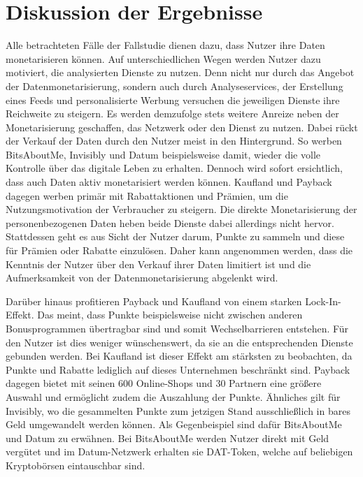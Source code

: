 \section{Diskussion der Ergebnisse}
Alle betrachteten Fälle der Fallstudie dienen dazu, dass Nutzer ihre Daten monetarisieren können. Auf unterschiedlichen Wegen werden Nutzer dazu motiviert, die analysierten Dienste zu nutzen. Denn nicht nur durch das Angebot der Datenmonetarisierung, sondern auch durch Analyseservices, der Erstellung eines Feeds und personalisierte Werbung versuchen die jeweiligen Dienste ihre Reichweite zu steigern. Es werden demzufolge stets weitere Anreize neben der Monetarisierung geschaffen, das Netzwerk oder den Dienst zu nutzen. Dabei rückt der Verkauf der Daten durch den Nutzer meist in den Hintergrund. So werben BitsAboutMe, Invisibly und Datum beispielsweise damit, wieder die volle Kontrolle über das digitale Leben zu erhalten. Dennoch wird sofort ersichtlich, dass auch Daten aktiv monetarisiert werden können. Kaufland und Payback dagegen werben primär mit Rabattaktionen und Prämien, um die Nutzungsmotivation der Verbraucher zu steigern. Die direkte Monetarisierung der personenbezogenen Daten heben beide Dienste dabei allerdings nicht hervor. Stattdessen geht es aus Sicht der Nutzer darum, Punkte zu sammeln und diese für Prämien oder Rabatte einzulösen. Daher kann angenommen werden, dass die Kenntnis der Nutzer über den Verkauf ihrer Daten limitiert ist und die Aufmerksamkeit von der Datenmonetarisierung abgelenkt wird. \newline

\noindent Darüber hinaus profitieren Payback und Kaufland von einem starken Lock-In-Effekt. Das meint, dass Punkte beispielsweise nicht zwischen anderen Bonusprogrammen übertragbar sind und somit Wechselbarrieren entstehen. Für den Nutzer ist dies weniger wünschenswert, da sie an die entsprechenden Dienste gebunden werden. Bei Kaufland ist dieser Effekt am stärksten zu beobachten, da Punkte und Rabatte lediglich auf dieses Unternehmen beschränkt sind. Payback dagegen bietet mit seinen 600 Online-Shops und 30 Partnern eine größere Auswahl und ermöglicht zudem die Auszahlung der Punkte. Ähnliches gilt für Invisibly, wo die gesammelten Punkte zum jetzigen Stand ausschließlich in bares Geld umgewandelt werden können. Als Gegenbeispiel sind dafür BitsAboutMe und Datum zu erwähnen. Bei BitsAboutMe werden Nutzer direkt mit Geld vergütet und im Datum-Netzwerk erhalten sie DAT-Token, welche auf beliebigen Kryptobörsen eintauschbar sind. \newline 


